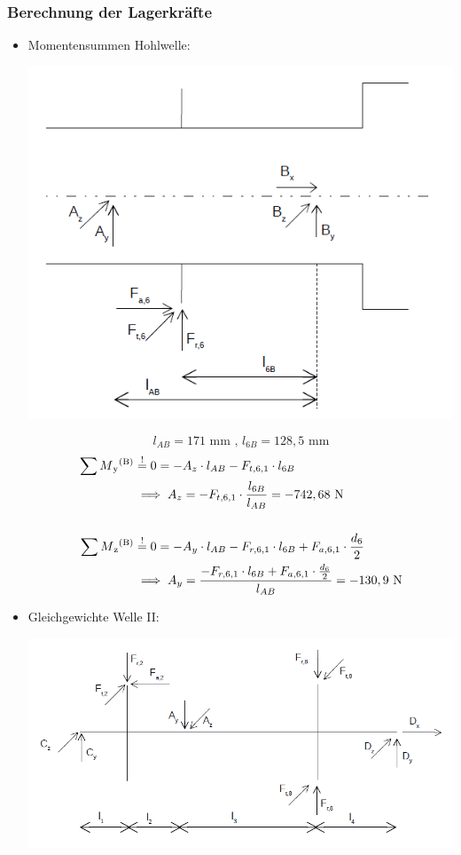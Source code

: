 \subsubsection{Berechnung der Lagerkräfte}
\begin{itemize}
\item Momentensummen Hohlwelle:
\begin{center}
	\includegraphics[width=1\textwidth,keepaspectratio]{figures/Gang1Hohl.png}
\end{center}
\[l_{AB} =171\text{ mm} \text{ , } l_{6B} = 128,5\text{ mm}\]
\begin{align*}
	\sum M\textsubscript{y}\textsuperscript{(B)} &\overset{!}{=} 0 = -A_z \cdot l_{AB} - F_{t,6,1} \cdot l_{6B} \\
	&\implies A_z = -F_{t,6,1} \cdot \frac{l_{6B}}{l_{AB}} = -742,68 \text{ N} \\ \\
	\sum M\textsubscript{z}\textsuperscript{(B)} &\overset{!}{=} 0 = -A_y \cdot l_{AB} - F_{r,6,1} \cdot l_{6B} + F_{a,6,1} \cdot \frac{d_6}{2}\\
	&\implies A_y = \frac{-F_{r,6,1} \cdot l_{6B} + F_{a,6,1} \cdot \frac{d_6}{2}} {l_{AB}}= -130,9 \text{ N} 
\end{align*}
\newpage
\item Gleichgewichte Welle II:
\begin{center}
	\includegraphics[width=1.04\textwidth,keepaspectratio]{figures/Gang1.png}

\end{center}
\end{itemize}
